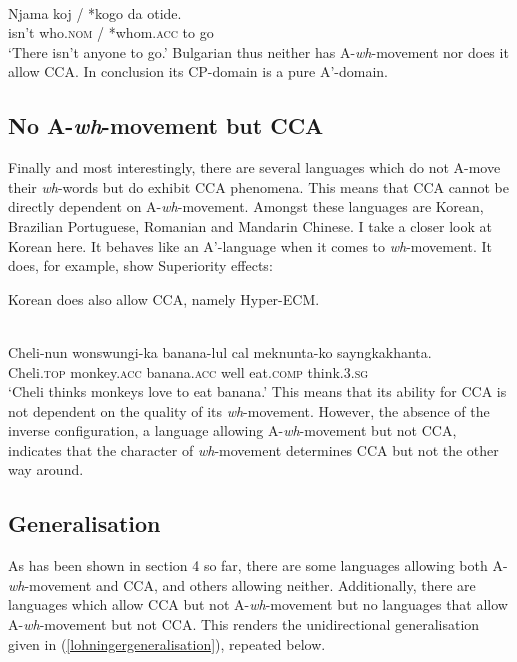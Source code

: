 \documentclass[output=paper,colorlinks,citecolor=brown]{langscibook}
\begin{document}
\ea \citep[192]{rudin21986aspects}\\
\gll Njama koj / *kogo da otide.\\
isn't who.\textsc{nom} / *whom.\textsc{acc} to go\\
\glt `There isn't anyone to go.'
\z
Bulgarian thus neither has A-\textit{wh}-movement nor does it allow CCA. In conclusion its CP-domain is a pure A'-domain. 



\subsection{No A-\textit{wh}-movement but CCA}
Finally and most interestingly, there are several languages which do not A-move their \textit{wh}-words but do exhibit CCA phenomena. This means that CCA cannot be directly dependent on A-\textit{wh}-movement. Amongst these languages are Korean, Brazilian Portuguese, Romanian and Mandarin Chinese. I take a closer look at Korean here. It behaves like an A'-language when it comes to \textit{wh}-movement. It does, for example, show Superiority effects:

\ea \citep[131]{jeong2003deriving}
\z 
\z
Korean does also allow CCA, namely Hyper-ECM.

\ea \citep[630]{yoon2007raising}\\
\gll Cheli-nun wonswungi-ka banana-lul cal meknunta-ko sayngkakhanta.\\
Cheli.\textsc{top} monkey.\textsc{acc} banana.\textsc{acc} well eat.\textsc{comp} think.\textsc{3.sg}\\
\glt `Cheli thinks monkeys love to eat banana.’
\z
This means that its ability for CCA is not dependent on the quality of its \textit{wh}-movement. However, the absence of the inverse configuration, a language allowing A-\textit{wh}-movement but not CCA, indicates that the character of \textit{wh}-movement determines CCA but not the other way around.

\subsection{Generalisation}
As has been shown in section 4 so far, there are some languages allowing both A-\textit{wh}-movement and CCA,  and others allowing neither. Additionally, there are languages which allow CCA but not A-\textit{wh}-movement but no languages that allow A-\textit{wh}-movement but not CCA. This renders the unidirectional generalisation given in (\ref{lohningergeneralisation}), repeated below.
\end{document}
